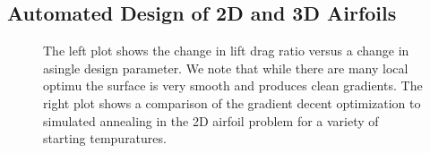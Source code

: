 \documentclass{article} %
\begin{document}
\subsection{Automated Design of 2D and 3D Airfoils}

\begin{figure}[h]
\begin{center}
\end{center}
\caption{The left plot shows the change in lift drag ratio versus a change in asingle design parameter. We note that while there are many local optimu the surface is very smooth and produces clean gradients. The right plot shows a comparison of the gradient decent optimization to simulated annealing in the 2D airfoil problem for a variety of starting tempuratures.}
\end{figure}
\end{document}
